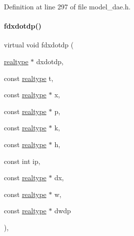 Definition at line 297 of file model\+\_\+dae.\+h.

\mbox{\label{classamici_1_1_model___d_a_e_a772b6fc2bd362707fe547466f0462278}} 
\paragraph{\texorpdfstring{fdxdotdp()}{fdxdotdp()}\hspace{0.1cm}{\footnotesize\ttfamily [3/3]}}
{\footnotesize\ttfamily virtual void fdxdotdp (\begin{DoxyParamCaption}\item[{\mbox{\hyperlink{namespaceamici_a1bdce28051d6a53868f7ccbf5f2c14a3}{realtype}} $\ast$}]{dxdotdp,  }\item[{const \mbox{\hyperlink{namespaceamici_a1bdce28051d6a53868f7ccbf5f2c14a3}{realtype}}}]{t,  }\item[{const \mbox{\hyperlink{namespaceamici_a1bdce28051d6a53868f7ccbf5f2c14a3}{realtype}} $\ast$}]{x,  }\item[{const \mbox{\hyperlink{namespaceamici_a1bdce28051d6a53868f7ccbf5f2c14a3}{realtype}} $\ast$}]{p,  }\item[{const \mbox{\hyperlink{namespaceamici_a1bdce28051d6a53868f7ccbf5f2c14a3}{realtype}} $\ast$}]{k,  }\item[{const \mbox{\hyperlink{namespaceamici_a1bdce28051d6a53868f7ccbf5f2c14a3}{realtype}} $\ast$}]{h,  }\item[{const int}]{ip,  }\item[{const \mbox{\hyperlink{namespaceamici_a1bdce28051d6a53868f7ccbf5f2c14a3}{realtype}} $\ast$}]{dx,  }\item[{const \mbox{\hyperlink{namespaceamici_a1bdce28051d6a53868f7ccbf5f2c14a3}{realtype}} $\ast$}]{w,  }\item[{const \mbox{\hyperlink{namespaceamici_a1bdce28051d6a53868f7ccbf5f2c14a3}{realtype}} $\ast$}]{dwdp }\end{DoxyParamCaption})\hspace{0.3cm}{\ttfamily [protected]}, {\ttfamily [virtual]}}

